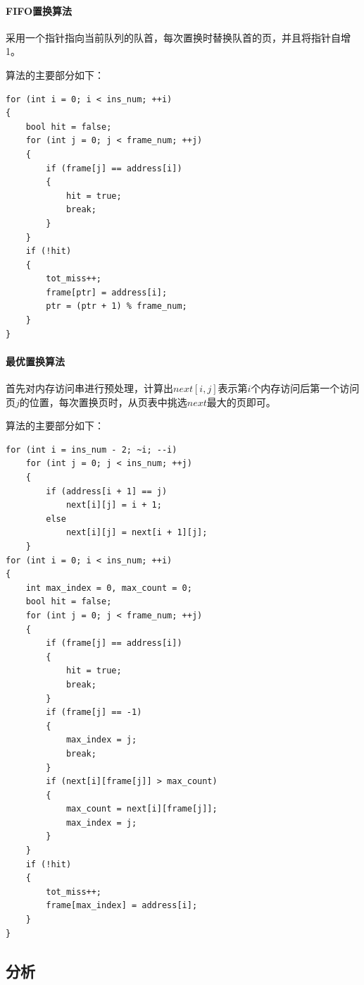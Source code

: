 \documentclass[lang=cn,11pt,a4paper,cite=authornum]{paper}
\begin{document}
\paragraph{FIFO置换算法}

采用一个指针指向当前队列的队首，每次置换时替换队首的页，并且将指针自增1。

算法的主要部分如下：

\begin{code}
\begin{verbatim}
for (int i = 0; i < ins_num; ++i)
{
    bool hit = false;
    for (int j = 0; j < frame_num; ++j)
    {
        if (frame[j] == address[i])
        {
            hit = true;
            break;
        }
    }
    if (!hit)
    {
        tot_miss++;
        frame[ptr] = address[i];
        ptr = (ptr + 1) % frame_num;
    }
}
\end{verbatim}
\end{code}

\paragraph{最优置换算法}

首先对内存访问串进行预处理，计算出$next[i,j]$表示第$i$个内存访问后第一个访问页$j$的位置，每次置换页时，从页表中挑选$next$最大的页即可。

算法的主要部分如下：

\begin{code}
\begin{verbatim}
for (int i = ins_num - 2; ~i; --i)
    for (int j = 0; j < ins_num; ++j)
    {
        if (address[i + 1] == j)
            next[i][j] = i + 1;
        else
            next[i][j] = next[i + 1][j];
    }
for (int i = 0; i < ins_num; ++i)
{
    int max_index = 0, max_count = 0;
    bool hit = false;
    for (int j = 0; j < frame_num; ++j)
    {
        if (frame[j] == address[i])
        {
            hit = true;
            break;
        }
        if (frame[j] == -1)
        {
            max_index = j;
            break;
        }
        if (next[i][frame[j]] > max_count)
        {
            max_count = next[i][frame[j]];
            max_index = j;
        }
    }
    if (!hit)
    {
        tot_miss++;
        frame[max_index] = address[i];
    }
}
\end{verbatim}
\end{code}

\subsection{分析}
\end{document}
